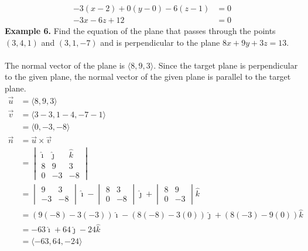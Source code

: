 \vspace{-3.5em}
\begin{align*}
    -3(x - 2) + 0(y - 0) - 6(z - 1) & = 0 \\
    -3x - 6z + 12                   & = 0
\end{align*}
\newpage
\noindent\textbf{Example 6. } Find the equation of the plane that passes through the points $(3, 4, 1)$ and $(3, 1, -7)$ and is perpendicular to the plane $8x + 9y + 3z  = 13$.
~\\\\
The normal vector of the plane is $\langle 8, 9, 3 \rangle$. Since the target plane is perpendicular to the given plane, the normal vector of the given plane is parallel to the target plane.
\begin{align*}
    \vec{u} & = \langle 8, 9, 3 \rangle                                                          \\
    \vec{v} & = \langle 3 - 3, 1 - 4, -7 - 1 \rangle                                             \\
            & = \langle 0, -3, -8 \rangle                                                        \\
    \vec{n} & = \vec{u} \times \vec{v}                                                           \\
            & = \begin{vmatrix}
                    \hat{\imath} & \hat{\jmath} & \hat{k} \\
                    8            & 9            & 3       \\
                    0            & -3           & -8
                \end{vmatrix}                        \\
            & = \begin{vmatrix}
                    9  & 3  \\
                    -3 & -8
                \end{vmatrix}\hat{\imath} - \begin{vmatrix}
                                                8 & 3  \\
                                                0 & -8
                                            \end{vmatrix}\hat{\jmath} + \begin{vmatrix}
                                                                            8 & 9  \\
                                                                            0 & -3
                                                                        \end{vmatrix}\hat{k}     \\
            & = (9(-8) - 3(-3))\hat{\imath} - (8(-8) - 3(0))\hat{\jmath} + (8(-3) - 9(0))\hat{k} \\
            & = -63\hat{\imath} + 64\hat{\jmath} - 24\hat{k}                                     \\
            & = \langle -63, 64, -24 \rangle
\end{align*}
